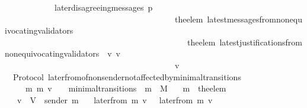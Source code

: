 \begin{isabellebody}
\ \ \ \ \ \ \ \ \ \ \ {\isasymand}\ later{\isacharunderscore}disagreeing{\isacharunderscore}messages\ {\isacharparenleft}p{\isacharcomma}\isanewline
\ \ \ \ \ \ \ \ \ \ \ \ \ \ \ \ \ \ \ \ \ \ \ \ \ \ \ \ \ \ \ \ \ \ \ \ \ \ \ \ \ the{\isacharunderscore}elem\ {\isacharparenleft}latest{\isacharunderscore}messages{\isacharunderscore}from{\isacharunderscore}non{\isacharunderscore}equivocating{\isacharunderscore}validators\ \isanewline
\ \ \ \ \ \ \ \ \ \ \ \ \ \ \ \ \ \ \ \ \ \ \ \ \ \ \ \ \ \ \ \ \ \ \ \ \ \ \ \ \ \ \ \ {\isacharparenleft}the{\isacharunderscore}elem\ {\isacharparenleft}latest{\isacharunderscore}justifications{\isacharunderscore}from{\isacharunderscore}non{\isacharunderscore}equivocating{\isacharunderscore}validators\ {\isasymsigma}\ v{\isacharparenright}{\isacharparenright}\ v{\isacharprime}{\isacharparenright}\isanewline
\ \ \ \ \ \ \ \ \ \ \ \ \ \ \ \ \ \ \ \ \ \ \ \ \ \ \ \ \ \ \ \ \ \ \ \ \ \ \ \ {\isacharcomma}\ v{\isacharprime}{\isacharcomma}\ {\isasymsigma}{\isacharparenright}\ {\isacharequal}\ {\isasymemptyset}{\isacharparenright}{\isacharparenright}{\isacharparenright}{\isachardoublequoteclose}\isanewline
\isanewline
\isanewline
\isanewline
\isanewline
{}\isamarkupfalse%
\ {\isacharparenleft}\ Protocol{\isacharparenright}\ later{\isacharunderscore}from{\isacharunderscore}of{\isacharunderscore}non{\isacharunderscore}sender{\isacharunderscore}not{\isacharunderscore}affected{\isacharunderscore}by{\isacharunderscore}minimal{\isacharunderscore}transitions\ {\isacharcolon}\isanewline
\ \ {\isachardoublequoteopen}{\isasymforall}\ {\isasymsigma}\ {\isasymsigma}{\isacharprime}\ m\ m{\isacharprime}\ v{\isachardot}\ {\isacharparenleft}{\isasymsigma}{\isacharcomma}\ {\isasymsigma}{\isacharprime}{\isacharparenright}\ {\isasymin}\ minimal{\isacharunderscore}transitions\ {\isasymand}\ m\ {\isasymin}\ M\isanewline
\ \ {\isasymlongrightarrow}\ m{\isacharprime}\ {\isacharequal}\ the{\isacharunderscore}elem\ {\isacharparenleft}{\isasymsigma}{\isacharprime}\ {\isacharminus}\ {\isasymsigma}{\isacharparenright}\isanewline
\ \ {\isasymlongrightarrow}\ v\ {\isasymin}\ V\ {\isacharminus}\ {\isacharbraceleft}sender\ m{\isacharprime}{\isacharbraceright}\isanewline
\ \ {\isasymlongrightarrow}\ later{\isacharunderscore}from\ {\isacharparenleft}m{\isacharcomma}\ v{\isacharcomma}\ {\isasymsigma}{\isacharparenright}\ {\isacharequal}\ later{\isacharunderscore}from\ {\isacharparenleft}m{\isacharcomma}\ v{\isacharcomma}\ {\isasymsigma}{\isacharprime}{\isacharparenright}{\isachardoublequoteclose}\isanewline
%
\isadelimproof
\ \ %
\endisadelimproof

\end{isabellebody}
